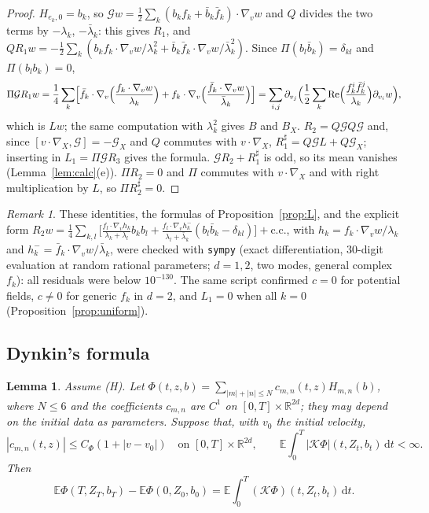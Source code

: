 \documentclass[11pt]{article}
\newcommand{\dd}{\mathrm{d}}
\newcommand{\E}{\mathbb{E}}
\newcommand{\cG}{\mathcal{G}}
\newcommand{\cK}{\mathcal{K}}
\newcommand{\R}{\mathbb{R}}
\renewcommand{\Re}{\operatorname{Re}}
\newtheorem{lemma}[theorem]{Lemma}
\theoremstyle{remark}
\newtheorem{remark}[theorem]{Remark}
\begin{document}
\begin{proof}
$H_{e_k,0}=b_k$, so $\cG w=\frac12\sum_k(b_kf_k+\bar b_k\bar f_k)\cdot
\nabla_vw$ and $Q$ divides the two terms by $-\lambda_k$, $-\bar\lambda_k$:
this gives $R_1$, and $QR_1w=-\frac12\sum_k(b_kf_k\cdot\nabla_vw/\lambda_k^2
+\bar b_k\bar f_k\cdot\nabla_vw/\bar\lambda_k^2)$. Since
$\Pi(b_l\bar b_k)=\delta_{kl}$ and $\Pi(b_lb_k)=0$,
\[
  \Pi\cG R_1w=\frac14\sum_k\Bigl[\bar f_k\cdot\nabla_v
    \Bigl(\frac{f_k\cdot\nabla_vw}{\lambda_k}\Bigr)
   +f_k\cdot\nabla_v\Bigl(\frac{\bar f_k\cdot\nabla_vw}{\bar\lambda_k}\Bigr)\Bigr]
  =\sum_{i,j}\partial_{v_j}\Bigl(\frac12\sum_k
    \Re\Bigl(\frac{f_k^i\bar f_k^j}{\lambda_k}\Bigr)\partial_{v_i}w\Bigr),
\]
which is $Lw$; the same computation with $\lambda_k^2$ gives $B$ and $B_X$.
$R_2=Q\cG Q\cG$ and, since $[v\cdot\nabla_X,\cG]=-\cG_X$ and $Q$ commutes
with $v\cdot\nabla_X$, $R_1^\sharp=Q\cG L+Q\cG_X$; inserting in $L_1=\Pi\cG
R_3$ gives the formula. $\cG R_2+R_1^\sharp$ is odd, so its mean vanishes
(Lemma~\ref{lem:calc}(e)). $\Pi R_2=0$ and $\Pi$ commutes with
$v\cdot\nabla_X$ and with right multiplication by $L$, so $\Pi R_2^\sharp=0$.
\end{proof}

\begin{remark}\label{rem:sym}
These identities, the formulas of Proposition~\ref{prop:L}, and the explicit
form
$R_2w=\frac14\sum_{k,l}\bigl[\frac{f_l\cdot\nabla_vh_k}{\lambda_k+\lambda_l}
b_kb_l+\frac{f_l\cdot\nabla_vh_k^-}{\lambda_l+\bar\lambda_k}
(b_l\bar b_k-\delta_{kl})\bigr]+\text{c.c.}$, with
$h_k=f_k\cdot\nabla_vw/\lambda_k$ and
$h_k^-=\bar f_k\cdot\nabla_vw/\bar\lambda_k$, were checked with
\texttt{sympy} (exact differentiation, 30-digit evaluation at random
rational parameters; $d=1,2$, two modes, general complex $f_k$): all
residuals were below $10^{-130}$. The same script confirmed $c=0$ for
potential fields, $c\ne0$ for generic $f_k$ in $d=2$, and $L_1=0$ when all
$k=0$ (Proposition~\ref{prop:uniform}).
\end{remark}

\subsection{Dynkin's formula}

\begin{lemma}\label{lem:dynkin}
Assume (H). Let
$\Phi(t,z,b)=\sum_{|m|+|n|\le N}c_{m,n}(t,z)H_{m,n}(b)$, where $N\le6$ and
the coefficients $c_{m,n}$ are $C^1$ on $[0,T]\times\R^{2d}$; they may
depend on the initial data as parameters. Suppose that, with $v_0$ the
initial velocity,
\[
  |c_{m,n}(t,z)|\le C_\Phi(1+|v-v_0|)\quad\text{on }[0,T]\times\R^{2d},
  \qquad
  \E\int_0^T|\cK\Phi|(t,Z_t,b_t)\,\dd t<\infty .
\]
Then
\[
  \E\Phi(T,Z_T,b_T)-\E\Phi(0,Z_0,b_0)=\E\int_0^T(\cK\Phi)(t,Z_t,b_t)\,\dd t .
\]
\end{lemma}
\end{document}
